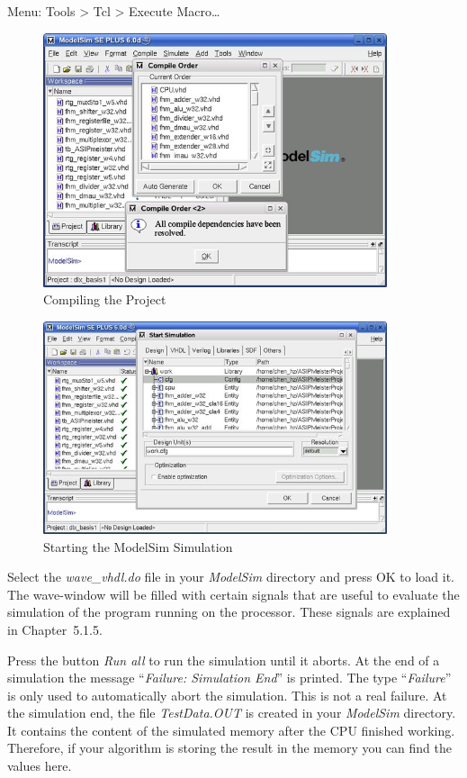 Menu: Tools \textgreater{} Tcl \textgreater{} Execute Macro\ldots{}
\begin{figure}[!htb]
	\centering
	\includegraphics[width=0.9\textwidth]{src/images/5-3.png}
	\caption{Compiling the Project}
	\label{fig:fig53}
\end{figure}
\begin{figure}[!htb]
	\centering
	\includegraphics[width=0.9\textwidth]{src/images/5-4.png}
	\caption{Starting the ModelSim Simulation}
	\label{fig:fig54}
\end{figure}
Select the \emph{wave\_vhdl.do} file in your \emph{ModelSim} directory
and press OK to load it. The wave-window will be filled with certain
signals that are useful to evaluate the simulation of the program
running on the processor. These signals are explained in Chapter~5.1.5.

Press the button \emph{Run all} to run the simulation until it aborts.
At the end of a simulation the message ``\emph{Failure: Simulation
End}'' is printed. The type ``\emph{Failure}'' is only used to
automatically abort the simulation. This is not a real failure. At the
simulation end, the file \emph{TestData.OUT} is created in your
\emph{ModelSim} directory. It contains the content of the simulated
memory after the CPU finished working. Therefore, if your algorithm is
storing the result in the memory you can find the values here.


